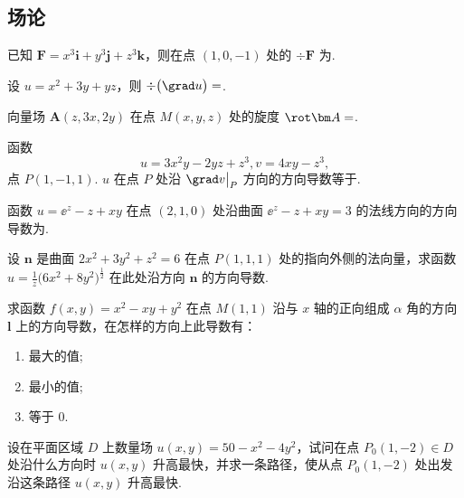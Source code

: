 \subsection{场论}

	\begin{ti}
		已知 $\bm F = x^{3} \bm i + y^{3} \bm j + z^{3} \bm k$，则在点 $(1,0,-1)$ 处的 $\div \bm F$ 为\htwo.
	\end{ti}

	\begin{ti}
		设 $u = x^{2} + 3y + yz$，则 $\div \bigl(\grad u\bigr) = $\htwo.
	\end{ti}

	\begin{ti}
		向量场 $\bm A(z,3x,2y)$ 在点 $M(x,y,z)$ 处的旋度 $\rot \bm A = $\htwo.
	\end{ti}

	\begin{ti}
		函数
		\[
			u = 3x^{2}y - 2yz + z^{3}, v = 4xy - z^{3},
		\]
		点 $P(1,-1,1)$. $u$ 在点 $P$ 处沿 $\grad v \bigr|_{P}$ 方向的方向导数等于\htwo.
	\end{ti}

	\begin{ti}
		函数 $u = \ee^{z} - z + xy$ 在点 $(2,1,0)$ 处沿曲面 $\ee^{z} - z + xy = 3$ 的法线方向的方向导数为\htwo.
	\end{ti}

	\begin{ti}
		设 $\bm n$ 是曲面 $2x^{2} + 3y^{2} + z^{2} = 6$ 在点 $P(1,1,1)$ 处的指向外侧的法向量，求函数 $u = \frac{1}{z} \bigl( 6x^{2} + 8y^{2} \bigr)^{\frac{1}{2}}$ 在此处沿方向 $\bm n$ 的方向导数.
	\end{ti}

	\begin{ti}
		求函数 $f(x,y) = x^{2} - xy + y^{2}$ 在点 $M(1,1)$ 沿与 $x$ 轴的正向组成 $\alpha$ 角的方向 $\bm l$ 上的方向导数，在怎样的方向上此导数有：
		\begin{enumerate}
			\item 最大的值;
			\item 最小的值;
			\item 等于 $0$.
		\end{enumerate}
	\end{ti}

	\begin{ti}
		设在平面区域 $D$ 上数量场 $u(x,y) = 50 - x^{2} - 4y^{2}$，试问在点 $P_{0}(1,-2) \in D$ 处沿什么方向时 $u(x,y)$ 升高最快，并求一条路径，使从点 $P_{0}(1,-2)$ 处出发沿这条路径 $u(x,y)$ 升高最快.
	\end{ti}


